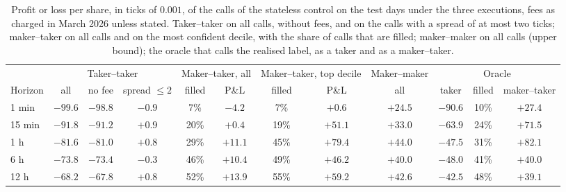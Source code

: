 \begin{table}[t]
\centering
\caption{Profit or loss per share, in ticks of $0.001$, of the calls of the stateless
control on the test days under the three executions, fees as charged in March 2026 unless
stated.  Taker--taker on all calls, without fees, and on the calls with a spread of at most
two ticks; maker--taker on all calls and on the most confident decile, with the share of
calls that are filled; maker--maker on all calls (upper bound); the oracle that calls the
realised label, as a taker and as a maker--taker.}
\label{tab:econ:pnl}
\small
\begin{fittable}\begin{tabular}{lccccccccccc}
\toprule
& \multicolumn{3}{c}{Taker--taker} & \multicolumn{2}{c}{Maker--taker, all} & \multicolumn{2}{c}{Maker--taker, top decile} & Maker--maker & \multicolumn{3}{c}{Oracle} \\
\cmidrule(lr){2-4}\cmidrule(lr){5-6}\cmidrule(lr){7-8}\cmidrule(lr){9-9}\cmidrule(lr){10-12}
Horizon & all & no fee & spread $\le 2$ & filled & P\&L & filled & P\&L & all & taker & filled & maker--taker \\
\midrule
1 min & $-99.6$ & $-98.8$ & $-0.9$ & 7\% & $-4.2$ & 7\% & $+0.6$ & $+24.5$ & $-90.6$ & 10\% & $+27.4$ \\
15 min & $-91.8$ & $-91.2$ & $+0.9$ & 20\% & $+0.4$ & 19\% & $+51.1$ & $+33.0$ & $-63.9$ & 24\% & $+71.5$ \\
1 h & $-81.6$ & $-81.0$ & $+0.8$ & 29\% & $+11.1$ & 45\% & $+79.4$ & $+44.0$ & $-47.5$ & 31\% & $+82.1$ \\
6 h & $-73.8$ & $-73.4$ & $-0.3$ & 46\% & $+10.4$ & 49\% & $+46.2$ & $+40.0$ & $-48.0$ & 41\% & $+40.0$ \\
12 h & $-68.2$ & $-67.8$ & $+0.8$ & 52\% & $+13.9$ & 55\% & $+59.2$ & $+42.6$ & $-42.5$ & 48\% & $+39.1$ \\
\bottomrule
\end{tabular}\end{fittable}
\end{table}

